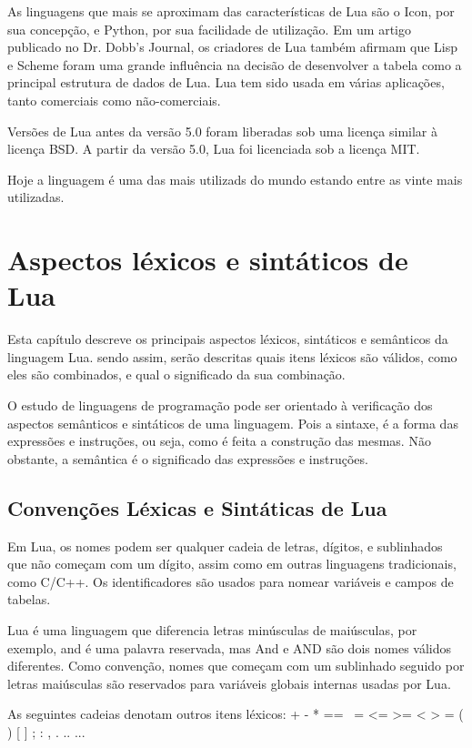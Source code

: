 \documentclass[
	12pt,				%
	openright,			%
	twoside,			%
	a4paper,			%
	english,			%
	brazil,				%
	]{abntex2}
\begin{document}
As linguagens que mais se aproximam das características de Lua são o Icon, por sua concepção, e Python, por sua facilidade de utilização. Em um artigo publicado no Dr. Dobb's Journal, os criadores de Lua também afirmam que Lisp e Scheme foram uma grande influência na decisão de desenvolver a tabela como a principal estrutura de dados de Lua. Lua tem sido usada em várias aplicações, tanto comerciais como não-comerciais.

Versões de Lua antes da versão 5.0 foram liberadas sob uma licença similar à licença BSD. A partir da versão 5.0, Lua foi licenciada sob a licença MIT.

Hoje a linguagem é uma das mais utilizads do mundo estando entre as vinte mais utilizadas.

\chapter{Aspectos léxicos e sintáticos de Lua}
Esta capítulo descreve os principais aspectos léxicos, sintáticos e semânticos da linguagem Lua. sendo assim, serão descritas quais itens léxicos são válidos, como eles são combinados, e qual o significado da sua combinação.

O estudo de linguagens de programação pode ser orientado à verificação dos aspectos semânticos e sintáticos de uma linguagem. Pois a sintaxe, é a forma das expressões e instruções, ou seja, como é feita a construção das mesmas. Não obstante, a semântica é o significado das expressões e instruções.

\section{Convenções Léxicas e Sintáticas de Lua}
Em Lua, os nomes podem ser qualquer cadeia de letras, dígitos, e sublinhados que não começam com um dígito, assim como em outras linguagens tradicionais, como C/C++. Os identificadores são usados para nomear variáveis e campos de tabelas.

Lua é uma linguagem que diferencia letras minúsculas de maiúsculas, por exemplo, and é uma palavra reservada, mas And e AND são dois nomes válidos diferentes. Como convenção, nomes que começam com um sublinhado seguido por letras maiúsculas são reservados para variáveis globais internas usadas por Lua.

As seguintes cadeias denotam outros itens léxicos:
+ - * == ~= <= >= < > = ( ) { } [ ] ; : , . .. ...
\end{document}
